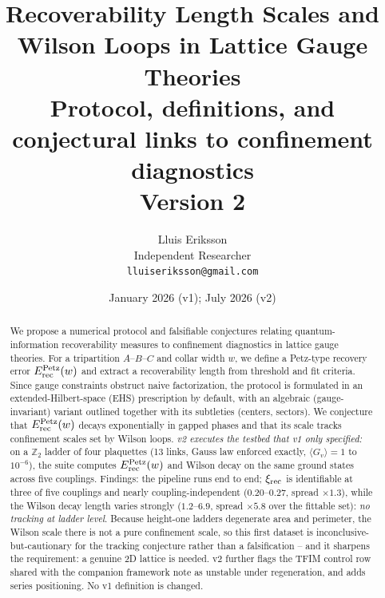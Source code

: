 \documentclass[11pt]{article}
\title{Recoverability Length Scales and Wilson Loops in Lattice Gauge
Theories\\
{\large Protocol, definitions, and conjectural links to confinement
diagnostics}\\
{\normalsize Version 2}}
\author{Lluis Eriksson\\ Independent Researcher\\ \texttt{lluiseriksson@gmail.com}}
\date{January 2026 (v1); July 2026 (v2)}
\theoremstyle{remark}
\newcommand{\Erec}{E^{\rm Petz}_{\rm rec}}
\begin{document}
\maketitle

\begin{abstract}
We propose a numerical protocol and falsifiable conjectures relating
quantum-information recoverability measures to confinement diagnostics in
lattice gauge theories. For a tripartition $A$--$B$--$C$ and collar width
$w$, we define a Petz-type recovery error $\Erec(w)$ and extract a
recoverability length from threshold and fit criteria. Since gauge
constraints obstruct naive factorization, the protocol is formulated in an
extended-Hilbert-space (EHS) prescription by default, with an algebraic
(gauge-invariant) variant outlined together with its subtleties (centers,
sectors). We conjecture that $\Erec(w)$ decays exponentially in gapped
phases and that its scale tracks confinement scales set by Wilson loops.
\emph{v2 executes the testbed that v1 only specified:} on a $\mathbb{Z}_2$
ladder of four plaquettes (13 links, Gauss law enforced exactly,
$\langle G_v \rangle = 1$ to $10^{-6}$), the suite computes $\Erec(w)$ and
Wilson decay on the same ground states across five couplings. Findings:
the pipeline runs end to end; $\xi_{\rm rec}$ is identifiable at three of
five couplings and nearly coupling-independent ($0.20$--$0.27$, spread
$\times 1.3$), while the Wilson decay length varies strongly ($1.2$--$6.9$,
spread $\times 5.8$ over the fittable set): \emph{no tracking at ladder level}. Because
height-one ladders degenerate area and perimeter, the Wilson scale there
is not a pure confinement scale, so this first dataset is
inconclusive-but-cautionary for the tracking conjecture rather than a
falsification -- and it sharpens the requirement: a genuine 2D lattice is
needed. v2 further flags the TFIM control row shared with the companion
framework note as unstable under regeneration, and adds series
positioning. No v1 definition is changed.
\end{abstract}
\end{document}
